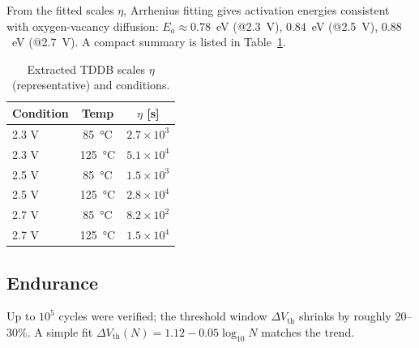\documentclass[conference]{IEEEtran}
\begin{document}
From the fitted scales \(\eta\), Arrhenius fitting gives activation energies consistent with oxygen-vacancy diffusion:
\(E_a \approx 0.78\)~eV (@2.3~V), \(0.84\)~eV (@2.5~V), \(0.88\)~eV (@2.7~V).
A compact summary is listed in Table~\ref{tab:tddb_eta}.

\begin{table}[t]
\centering
\caption{Extracted TDDB scales \(\eta\) (representative) and conditions.}
\label{tab:tddb_eta}
\begin{tabular}{@{}lcc@{}}
\toprule
Condition & Temp & \(\eta\) [s]\\
\midrule
2.3 V & \SI{85}{\celsius} & \(2.7\times10^{3}\) \\
2.3 V & \SI{125}{\celsius} & \(5.1\times10^{4}\) \\
2.5 V & \SI{85}{\celsius} & \(1.5\times10^{3}\) \\
2.5 V & \SI{125}{\celsius} & \(2.8\times10^{4}\) \\
2.7 V & \SI{85}{\celsius} & \(8.2\times10^{2}\) \\
2.7 V & \SI{125}{\celsius} & \(1.5\times10^{4}\) \\
\bottomrule
\end{tabular}
\end{table}

\subsection{Endurance}
Up to \(10^{5}\) cycles were verified; the threshold window \(\Delta V_{\mathrm{th}}\) shrinks by roughly 20–30\%.
A simple fit \(\Delta V_{\mathrm{th}}(N)=1.12-0.05\log_{10}N\) matches the trend.
\end{document}
